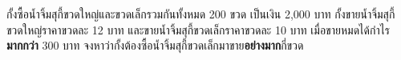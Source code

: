 ﻿%
\question กั้งซื้อน้ำจิ้มสุกี้ขวดใหญ่และขวดเล็กรวมกันทั้งหมด 200 ขวด เป็นเงิน 2,000 บาท กั้งขายน้ำจิ้มสุกี้ขวดใหญ่ราคาขวดละ 12 บาท และขายน้ำจิ้มสุกี้ขวดเล็กราคาขวดละ 10 บาท เมื่อขายหมดได้กำไร\textbf{มากกว่า} 300 บาท จงหาว่ากั้งต้องซื้อน้ำจิ้มสุกี้ขวดเล็กมาขาย\textbf{อย่างมาก}กี่ขวด
\newline
{}
